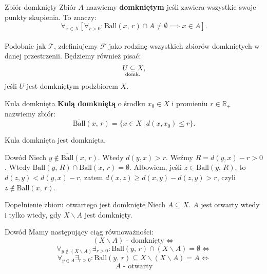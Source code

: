 \documentclass{article}
\newcounter{defi}
\numberwithin{defi}{section}
\numberwithin{defi}{section}
\newcommand{\R}{\mathbb{R}}
\newcommand{\Tau}{\mathcal{T}}
\newcommand{\Fau}{\mathcal{F}}
\newcommand{\subdomk}{\underset{\clap{\scriptsize domk.}}{\subseteq}}
\newcommand{\ball}[2]{\text{Ball}(#1, \, #2)}
\newcommand{\dball}[2]{\overline{\text{Ball}}(#1, \, #2)}
\begin{document}
\begin{defr}{Zbiór domknięty}
    Zbiór $A$ nazwiemy \textbf{domkniętym} jeśli zawiera wszystkie swoje punkty skupienia. To znaczy: \begin{equation}
        \forall_{x \in X} [\forall_{r>0}: \ball{x}{r} \cap A \neq \emptyset \implies x \in A].
    \end{equation}
    \\
    Podobnie jak $\Tau$, zdefiniujemy $\Fau$ jako rodzinę wszystkich zbiorów domkniętych w danej przestrzenii. Będziemy również pisać:
    \begin{equation}
        U \subdomk X,
    \end{equation}
    jeśli $U$ jest domkniętym podzbiorem $X$.
\end{defr}

\begin{defr}{Kula domknięta}
    \textbf{Kulą domkniętą} o środku $x_0 \in X$ i promieniu $r \in \R_+$ nazwiemy zbiór: \begin{equation}
        \dball{x}{r} = \{ x\in X \, | \, d(x, x_0) \leqslant r\}.
    \end{equation}
\end{defr}

\begin{twier}{}
    Kula domknięta jest domknięta.
\end{twier}

\begin{dow}{Dowód}
    Niech $y \notin \dball{x}{r}$. Wtedy $d(y, x) > r$. Weźmy $R = d(y, x) - r > 0$. Wtedy $\ball{y}{R} \cap \dball{x}{r} = \emptyset$. Albowiem, jeśli $z \in \ball{y}{R}$, to $d(z, y) <  d(y, x) - r $, zatem $d(x, z) \geqslant d(x, y) - d(z, y)  > r$, czyli $z \notin \dball{x}{r}$.
\end{dow}

\begin{twier}{Dopełnienie zbioru otwartego jest domknięte}\label{twier:dopelnienie-otwartego}
    Niech $A \subseteq X$. $A$ jest otwarty wtedy i tylko wtedy, gdy $X \backslash A$ jest domknięty.
\end{twier}



\begin{dow}{Dowód}
    Mamy następujący ciąg równoważności:
    \begin{equation}
        (X \backslash A) \text{ - domknięty} \iff
    \end{equation}
    \begin{equation}
        \forall_{y \notin (X \backslash A)} \exists_{r > 0}: \ball{y}{r} \cap (X \backslash A) =  \emptyset \iff
    \end{equation}
    \begin{equation}
        \forall_{y \in A} \exists_{r > 0}: \ball{y}{r} \subseteq X \backslash (X \backslash A) = A \iff
    \end{equation}
    \begin{equation}
        A \text{ - otwarty}
    \end{equation}
\end{dow}
\end{document}
